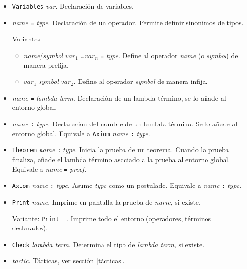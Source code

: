 \documentclass[a4paper,11pt]{article}
\theoremstyle{definition}
\theoremstyle{remark}
\begin{document}
\begin{itemize}

\item \texttt{Variables} \textit{var}. Declaración de variables.
\item \textit{name} \texttt{=} \textit{type}. Declaración de un operador.
  Permite definir sinónimos de tipos. 

  Variantes:
  \begin{itemize}
  \item \textit{name}/\textit{symbol} $var_1$ \ldots $var_n$ \texttt{=} \textit{type}.
    Define al operador \textit{name} (o \textit{symbol}) de manera prefija. 
  \item $var_1$ \textit{symbol} $var_2$. Define al operador \textit{symbol} de manera infija.

  \end{itemize}

\item \textit{name} \texttt{=} \textit{lambda term}. Declaración de un lambda término,
se lo añade al entorno global.

\item \textit{name} \texttt{:} \textit{type}. Declaración del nombre de un lambda término. 
Se lo añade al entorno global. Equivale a \texttt{Axiom} \textit{name} \texttt{:} \textit{type}.

\item \texttt{Theorem} \textit{name} \texttt{:} \textit{type}. Inicia la prueba de un
teorema. Cuando la prueba finaliza, añade el lambda término asociado a la prueba al entorno global.
Equivale a \textit{name} \texttt{=} \textit{proof}.


\item \texttt{Axiom} \textit{name} \texttt{:} \textit{type}. Asume \textit{type} como un postulado.
Equivale a \textit{name} \texttt{:} \textit{type}.

\item \texttt{Print} \textit{name}. Imprime en pantalla la prueba de \textit{name}, si existe.

Variante:
\texttt{Print} \_. Imprime todo el entorno (operadores, términos declarados).

\item \texttt{Check} \textit{lambda term}. Determina el tipo de \textit{lambda term}, si existe.

\item \textit{tactic}. Tácticas, ver sección \ref{tácticas}.

\end{itemize}
\end{document}
